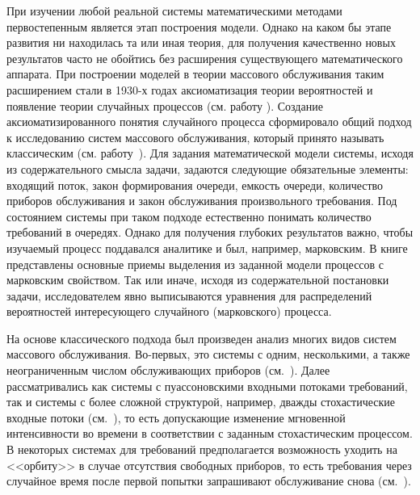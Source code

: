 При изучении любой реальной системы математическими методами первостепенным является этап построения модели. 
Однако на каком бы этапе развития ни находилась та или иная теория, для получения качественно новых результатов часто не обойтись без расширения существующего математического аппарата.  
При построении моделей в теории массового обслуживания таким расширением стали в 1930-х годах аксиоматизация теории вероятностей и появление теории случайных процессов (см. работу \cite{Kolmogorov:1974}).
Создание аксиоматизированного понятия случайного процесса сформировало общий подход к исследованию систем массового обслуживания, который принято называть классическим (см. работу~\cite{Fedotkin:1996}). Для задания математической модели системы, исходя из содержательного смысла задачи, задаются следующие обязательные элементы: входящий поток, закон формирования очереди, емкость очереди, количество приборов обслуживания и закон обслуживания произвольного требования. Под состоянием системы при таком подходе естественно понимать количество требований в очередях. Однако для получения глубоких результатов важно, чтобы изучаемый процесс поддавался аналитике и был, например, марковским. В книге \cite{GnedenkoKovalenko} представлены основные приемы выделения из заданной модели процессов с марковским свойством. Так или иначе, исходя из содержательной постановки задачи, исследователем явно выписываются уравнения для распределений вероятностей интересующего случайного (марковского) процесса.

На основе классического подхода был произведен анализ многих видов систем массового обслуживания. Во-первых, это системы с одним, несколькими, а также неограниченным числом обслуживающих приборов (см.~\cite{afanasyeva, tatashev, brumelle}). Далее рассматривались как системы с пуассоновскими входными потоками требований, так и системы с более сложной структурой, например, дважды стохастические входные потоки (см.~\cite{dudin:1997, Grandell:1976, Neuts:1979}), то есть допускающие изменение мгновенной интенсивности во времени в соответствии с заданным стохастическим процессом. В некоторых системах для требований предполагается возможность  уходить на <<орбиту>> в случае отсутствия свободных приборов, то есть требования через случайное время после первой попытки запрашивают обслуживание снова (см.~\cite{fallin}). 

